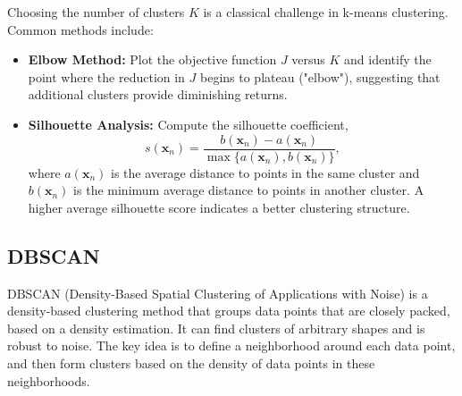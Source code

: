 \documentclass[12pt]{article}
\begin{document}
Choosing the number of clusters $K$ is a classical challenge in k-means clustering. Common methods include:
\begin{itemize}
    \item \textbf{Elbow Method:} Plot the objective function $J$ versus $K$ and identify the point where the reduction in $J$ begins to plateau ("elbow"), suggesting that additional clusters provide diminishing returns.
    \item \textbf{Silhouette Analysis:} Compute the silhouette coefficient,
    \[
    s(\bm{x}_n) = \frac{b(\bm{x}_n) - a(\bm{x}_n)}{\max\{a(\bm{x}_n), b(\bm{x}_n)\}},
    \]
    where $a(\bm{x}_n)$ is the average distance to points in the same cluster and $b(\bm{x}_n)$ is the minimum average distance to points in another cluster. A higher average silhouette score indicates a better clustering structure.
\end{itemize}


\subsection{DBSCAN}
DBSCAN (Density-Based Spatial Clustering of Applications with Noise) is a density-based clustering method that groups data points that are closely packed, based on a density estimation. It can find clusters of arbitrary shapes and is robust to noise. The key idea is to define a neighborhood around each data point, and then form clusters based on the density of data points in these neighborhoods.

\end{document}
